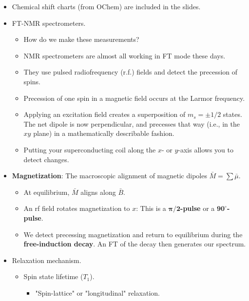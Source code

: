 \documentclass[../notes.tex]{subfiles}
\begin{document}
\begin{itemize}
\begin{itemize}
        \item Shielding is a small effect (on the order of \num{e-6}, so we use ppm $\delta$).
        \item Example: 1 ppm at \SI{500}{\mega\hertz} is $\nu=\SI{500}{\hertz}$, which is tiny (on the order of microjoules).
    \end{itemize}
    \item Chemical shift charts (from OChem) are included in the slides.
    \item FT-NMR spectrometers.
    \begin{itemize}
        \item How do we make these measurements?
        \item NMR spectrometers are almost all working in FT mode these days.
        \item They use pulsed radiofrequency (r.f.) fields and detect the precession of spins.
        \item Precession of one spin in a magnetic field occurs at the Larmor frequency.
        \item Applying an excitation field creates a superposition of $m_s=\pm 1/2$ states. The net dipole is now perpendicular, and precesses that way (i.e., in the $xy$ plane) in a mathematically describable fashion.
        \item Putting your superconducting coil along the $x$- or $y$-axis allows you to detect changes.
    \end{itemize}
    \item \textbf{Magnetization}: The macroscopic alignment of magnetic dipoles $\bar{M}=\sum\bar{\mu}$.
    \begin{itemize}
        \item At equilibrium, $\bar{M}$ aligns along $\bar{B}$.
        \item An rf field rotates magnetization to $x$: This is a \textbf{$\bm{\pi/2}$-pulse} or a \textbf{$\bm{90^\circ}$-pulse}.
        \item We detect precessing magnetization and return to equilibrium during the \textbf{free-induction decay}. An FT of the decay then generates our spectrum.
    \end{itemize}
    \item Relaxation mechanism.
    \begin{itemize}
        \item Spin state lifetime ($T_1$).
        \begin{itemize}
            \item "Spin-lattice" or "longitudinal" relaxation.

\end{itemize}
\end{itemize}
\end{itemize}
\end{document}
